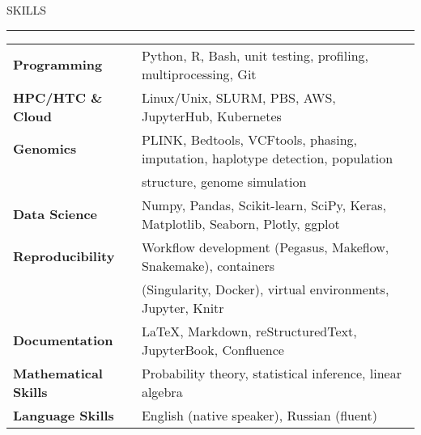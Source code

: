 \documentclass{resume} %
\renewenvironment{rSection}[1]{
\sectionskip
\textcolor{RoyalPurple}{\MakeUppercase{#1}}
\sectionlineskip
\hrule
\begin{list}{}{
\setlength{\leftmargin}{1.5em}
}
\item[]
}{
\end{list}
}
\begin{document}
\begin{rSection}{Skills}

\begin{tabular}{ @{} >{\bfseries}l @{\hspace{6ex}} l }
Programming & Python, R, Bash, unit testing, profiling, multiprocessing, Git\\
HPC/HTC \& Cloud & Linux/Unix, SLURM, PBS, AWS, JupyterHub, Kubernetes  \\
Genomics & PLINK, Bedtools, VCFtools, phasing, imputation, haplotype detection, population \\ & structure, genome simulation\\
Data Science & Numpy, Pandas, Scikit-learn, SciPy, Keras, Matplotlib, Seaborn, Plotly, ggplot \\
Reproducibility & Workflow development (Pegasus, Makeflow, Snakemake), containers \\ & (Singularity, Docker), virtual environments, Jupyter, Knitr \\
Documentation & \LaTeX, Markdown, reStructuredText, JupyterBook, Confluence \\
Mathematical Skills & Probability theory, statistical inference, linear algebra \\
Language Skills & English (native speaker), Russian (fluent) \\
\end{tabular}

\end{rSection}

\end{document}
